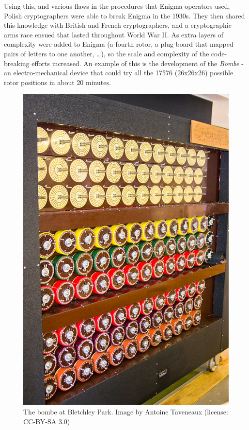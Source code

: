 \documentclass[
  letterpaper,
  DIV=11,
  numbers=noendperiod]{scrreprt}
\begin{document}
Using this, and various flaws in the procedures that Enigma operators
used, Polish cryptographers were able to break Enigma in the 1930s. They
then shared this knowledge with British and French cryptographers, and a
cryptographic arms race ensued that lasted throughout World War II. As
extra layers of complexity were added to Enigma (a fourth rotor, a
plug-board that mapped pairs of letters to one another, \ldots), so the
scale and complexity of the code-breaking efforts increased. An example
of this is the development of the \emph{Bombe} - an electro-mechanical
device that could try all the 17576 (26x26x26) possible rotor positions
in about 20 minutes.

\begin{figure}

{\centering \includegraphics{images/BletchleyParkBombe.jpg}

}

\caption{The bombe at Bletchley Park. Image by Antoine Taveneaux
(license: CC-BY-SA 3.0)}

\end{figure}
\end{document}

